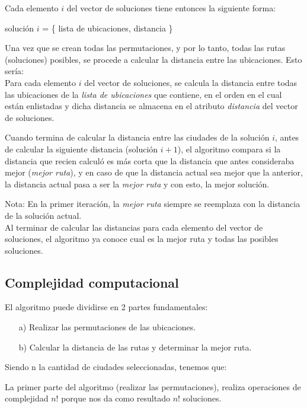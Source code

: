 \documentclass[10pt]{report}
\begin{document}
Cada elemento $i$ del vector de soluciones tiene entonces la siguiente forma: 
\begin{center} solución $i$ = \{ lista de ubicaciones, distancia \} \end{center}

Una vez que se crean todas las permutaciones, y por lo tanto, todas las rutas (soluciones) posibles, se procede a calcular la distancia entre las ubicaciones. Esto sería:\\

Para cada elemento $i$ del vector de soluciones, se calcula la distancia entre todas las ubicaciones de la \textit{lista de ubicaciones} que contiene, en el orden en el cual están enlistadas y dicha distancia se almacena en el atributo \textit{distancia} del vector de soluciones.

Cuando termina de calcular la distancia entre las ciudades de la solución $i$, antes de calcular la siguiente distancia (solución $i+1$), el algoritmo compara si la distancia que recien calculó es más corta que la distancia que antes consideraba mejor (\textit{mejor ruta}), y en caso de que la distancia actual sea mejor que la anterior, la distancia actual pasa a ser la \textit{mejor ruta} y con esto, la mejor solución.

Nota: En la primer iteración, la \textit{mejor ruta} siempre se reemplaza con la distancia de la solución actual.\\

Al terminar de calcular las distancias para cada elemento del vector de soluciones, el algoritmo ya conoce cual es la mejor ruta y todas las posibles soluciones. 

\subsection*{Complejidad computacional}
El algoritmo puede dividirse en 2 partes fundamentales:

\begin{enumerate}
\item[a)] Realizar las permutaciones de las ubicaciones.
\item[b)] Calcular la distancia de las rutas y determinar la mejor ruta.

\end{enumerate}
Siendo n la cantidad de ciudades seleccionadas, tenemos que:

La primer parte del algoritmo (realizar las permutaciones), realiza operaciones de complejidad $n!$ porque nos da como resultado $n!$ soluciones.
\end{document}
